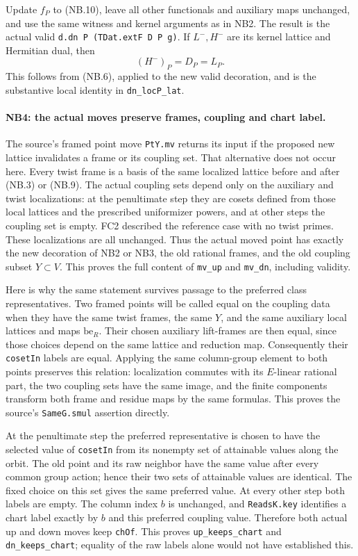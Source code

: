 Update $f_P$ to (NB.10), leave all other functionals and auxiliary maps
unchanged, and use the same witness and kernel arguments as in NB2.
The result is the actual valid \texttt{d.dn P (TDat.extF D P g)}.
If $L^-,H^-$ are its kernel lattice and Hermitian dual, then
\[
                         (H^-)_P=D_P=L_P.           \tag{NB.11}
\]
This follows from (NB.6), applied to the new valid decoration, and is
the substantive local identity in \texttt{dn\_locP\_lat}.

\paragraph{NB4: the actual moves preserve frames, coupling and chart label.}
The source's framed point move \texttt{PtY.mv} returns its input if the
proposed new lattice invalidates a frame or its coupling set. That
alternative does not occur here. Every twist frame is a basis of the
same localized lattice before and after (NB.3) or (NB.9). The actual
coupling sets depend only on the auxiliary and twist localizations:
at the penultimate step they are cosets defined from those local
lattices and the prescribed uniformizer powers, and at other steps
the coupling set is empty. FC2 described the reference case with no
twist primes. These localizations are all
unchanged. Thus the actual moved point has exactly the new decoration
of NB2 or NB3, the old rational frames, and the old coupling subset
$Y\subset V$. This proves the full content of \texttt{mv\_up} and
\texttt{mv\_dn}, including validity.

Here is why the same statement survives passage to the preferred
class representatives. Two framed points will be called equal on
the coupling data when they have the same twist frames, the same
$Y$, and the same auxiliary local lattices and maps
$\mathrm{be}_R$. Their chosen auxiliary lift-frames are then equal,
since those choices depend on the same lattice and reduction map.
Consequently their \texttt{cosetIn} labels are equal. Applying the
same column-group element to both points preserves this relation:
localization commutes with its $E$-linear rational part, the two
coupling sets have the same image, and the finite components transform
both frame and residue maps by the same formulas. This proves the
source's \texttt{SameG.smul} assertion directly.

At the penultimate step the preferred representative is chosen to
have the selected value of \texttt{cosetIn} from its nonempty set of
attainable values along the orbit. The old point and its raw neighbor
have the same value after every common group action; hence their two
sets of attainable values are identical. The fixed choice on this
set gives the same preferred value. At every other step both labels
are empty. The column index $b$ is unchanged, and \texttt{ReadsK.key}
identifies a chart label exactly by $b$ and this preferred coupling
value. Therefore both actual up and down moves keep \texttt{chOf}.
This proves \texttt{up\_keeps\_chart} and \texttt{dn\_keeps\_chart};
equality of the raw labels alone would not have established this.

